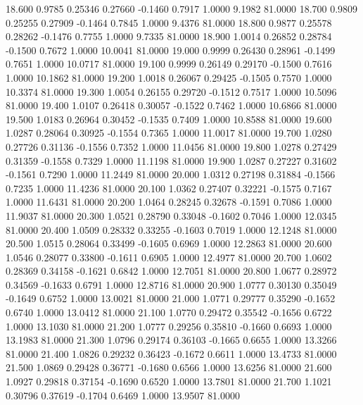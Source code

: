   18.600   0.9785   0.25346   0.27660  -0.1460   0.7917   1.0000   9.1982  81.0000
  18.700   0.9809   0.25255   0.27909  -0.1464   0.7845   1.0000   9.4376  81.0000
  18.800   0.9877   0.25578   0.28262  -0.1476   0.7755   1.0000   9.7335  81.0000
  18.900   1.0014   0.26852   0.28784  -0.1500   0.7672   1.0000  10.0041  81.0000
  19.000   0.9999   0.26430   0.28961  -0.1499   0.7651   1.0000  10.0717  81.0000
  19.100   0.9999   0.26149   0.29170  -0.1500   0.7616   1.0000  10.1862  81.0000
  19.200   1.0018   0.26067   0.29425  -0.1505   0.7570   1.0000  10.3374  81.0000
  19.300   1.0054   0.26155   0.29720  -0.1512   0.7517   1.0000  10.5096  81.0000
  19.400   1.0107   0.26418   0.30057  -0.1522   0.7462   1.0000  10.6866  81.0000
  19.500   1.0183   0.26964   0.30452  -0.1535   0.7409   1.0000  10.8588  81.0000
  19.600   1.0287   0.28064   0.30925  -0.1554   0.7365   1.0000  11.0017  81.0000
  19.700   1.0280   0.27726   0.31136  -0.1556   0.7352   1.0000  11.0456  81.0000
  19.800   1.0278   0.27429   0.31359  -0.1558   0.7329   1.0000  11.1198  81.0000
  19.900   1.0287   0.27227   0.31602  -0.1561   0.7290   1.0000  11.2449  81.0000
  20.000   1.0312   0.27198   0.31884  -0.1566   0.7235   1.0000  11.4236  81.0000
  20.100   1.0362   0.27407   0.32221  -0.1575   0.7167   1.0000  11.6431  81.0000
  20.200   1.0464   0.28245   0.32678  -0.1591   0.7086   1.0000  11.9037  81.0000
  20.300   1.0521   0.28790   0.33048  -0.1602   0.7046   1.0000  12.0345  81.0000
  20.400   1.0509   0.28332   0.33255  -0.1603   0.7019   1.0000  12.1248  81.0000
  20.500   1.0515   0.28064   0.33499  -0.1605   0.6969   1.0000  12.2863  81.0000
  20.600   1.0546   0.28077   0.33800  -0.1611   0.6905   1.0000  12.4977  81.0000
  20.700   1.0602   0.28369   0.34158  -0.1621   0.6842   1.0000  12.7051  81.0000
  20.800   1.0677   0.28972   0.34569  -0.1633   0.6791   1.0000  12.8716  81.0000
  20.900   1.0777   0.30130   0.35049  -0.1649   0.6752   1.0000  13.0021  81.0000
  21.000   1.0771   0.29777   0.35290  -0.1652   0.6740   1.0000  13.0412  81.0000
  21.100   1.0770   0.29472   0.35542  -0.1656   0.6722   1.0000  13.1030  81.0000
  21.200   1.0777   0.29256   0.35810  -0.1660   0.6693   1.0000  13.1983  81.0000
  21.300   1.0796   0.29174   0.36103  -0.1665   0.6655   1.0000  13.3266  81.0000
  21.400   1.0826   0.29232   0.36423  -0.1672   0.6611   1.0000  13.4733  81.0000
  21.500   1.0869   0.29428   0.36771  -0.1680   0.6566   1.0000  13.6256  81.0000
  21.600   1.0927   0.29818   0.37154  -0.1690   0.6520   1.0000  13.7801  81.0000
  21.700   1.1021   0.30796   0.37619  -0.1704   0.6469   1.0000  13.9507  81.0000

